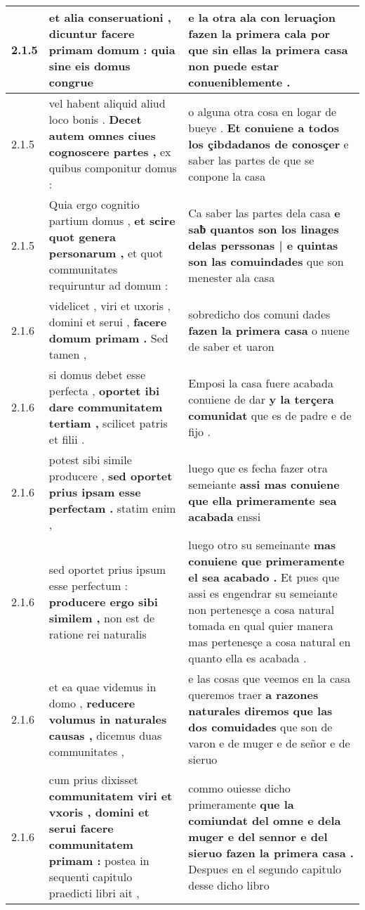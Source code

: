 \begin{tabular}{|p{1cm}|p{6.5cm}|p{6.5cm}|}
2.1.5 & et alia conseruationi , \textbf{ dicuntur facere primam domum : } quia sine eis domus congrue & e la otra ala con leruaçion \textbf{ fazen la primera cala } por que sin ellas la primera casa non puede estar conueniblemente . \\\hline
2.1.5 & vel habent aliquid aliud loco bonis . \textbf{ Decet autem omnes ciues cognoscere partes , } ex quibus componitur domus : & o alguna otra cosa en logar de bueye . \textbf{ Et conuiene a todos los çibdadanos de conosçer } e saber las partes de que se conpone la casa \\\hline
2.1.5 & Quia ergo cognitio partium domus , \textbf{ et scire quot genera personarum , } et quot communitates requiruntur ad domum : & Ca saber las partes dela casa \textbf{ e saƀ quantos son los linages delas perssonas | e quintas son las comuindades } que son menester ala casa \\\hline
2.1.6 & videlicet , viri et uxoris , domini et serui , \textbf{ facere domum primam . } Sed tamen , & sobredicho dos comuni dades \textbf{ fazen la primera casa } o nuene de saber et uaron \\\hline
2.1.6 & si domus debet esse perfecta , \textbf{ oportet ibi dare communitatem tertiam , } scilicet patris et filii . & Emposi la casa fuere acabada conuiene de dar \textbf{ y la terçera comunidat } que es de padre e de fijo . \\\hline
2.1.6 & potest sibi simile producere , \textbf{ sed oportet prius ipsam esse perfectam . } statim enim , & luego que es fecha fazer otra semeiante \textbf{ assi mas conuiene que ella primeramente sea acabada } enssi \\\hline
2.1.6 & sed oportet prius ipsum esse perfectum : \textbf{ producere ergo sibi similem , } non est de ratione rei naturalis & luego otro su semeinante \textbf{ mas conuiene que primeramente el sea acabado . } Et pues que assi es engendrar su semeiante non pertenesçe a cosa natural tomada en qual quier manera mas pertenesçe a cosa natural en quanto ella es acabada . \\\hline
2.1.6 & et ea quae videmus in domo , \textbf{ reducere volumus in naturales causas , } dicemus duas communitates , & e las cosas que veemos en la casa queremos traer \textbf{ a razones naturales diremos que las dos comuidades } que son de varon e de muger e de señor e de sieruo \\\hline
2.1.6 & cum prius dixisset \textbf{ communitatem viri et vxoris , domini et serui facere communitatem primam : } postea in sequenti capitulo praedicti libri ait , & commo ouiesse dicho primeramente \textbf{ que la comiundat del omne e dela muger e del sennor e del sieruo fazen la primera casa . } Despues en el segundo capitulo desse dicho libro \\\hline

\end{tabular}
